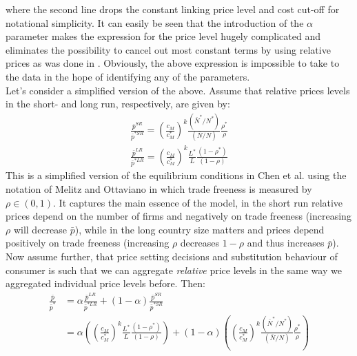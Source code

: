 where the second line drops the constant linking price level and cost cut-off for notational simplicity. It can easily be seen that the introduction of the $\alpha$ parameter makes the expression for the price level hugely complicated and eliminates the possibility to cancel out most constant terms by using relative prices as was done in \citet{Chen2009}. Obviously, the above expression is impossible to take to the data in the hope of identifying any of the parameters. \\
Let's consider a simplified version of the above. Assume that relative prices levels in the short- and long run, respectively, are given by:
\begin{align*}
\frac{\bar{p}^{SR}}{\bar{p}^{*SR}} = \left( \frac{c_M}{c_M^*} \right)^k \frac{(\bar{N}^* / N^*)}{(\bar{N} / N)} \frac{\rho^*}{\rho} \\
\frac{\bar{p}^{LR}}{\bar{p}^{*LR}} = \left( \frac{c_M}{c_M^*} \right)^k \frac{L^*}{L} \frac{(1-\rho^*)}{(1-\rho)}
\end{align*}
This is a simplified version of the equilibrium conditions in Chen et al. using the notation of Melitz and Ottaviano in which trade freeness is measured by $\rho \in (0,1)$. It captures the main essence of the model, in the short run relative prices depend on the number of firms and negatively on trade freeness (increasing $\rho$ will decrease $\bar{p}$), while in the long country size matters and prices depend positively on trade freeness (increasing $\rho$ decreases $1-\rho$ and thus increases $\bar{p}$). Now assume further, that price setting decisions and substitution behaviour of consumer is such that we can aggregate \textit{relative} price levels in the same way we aggregated individual price levels before. Then:
\begin{align*}
\frac{\bar{p}}{\bar{p}^*} &= \alpha \frac{\bar{p}^{LR}}{\bar{p}^{*LR}} + (1-\alpha) \frac{\bar{p}^{SR}}{\bar{p}^{*SR}} \\
													&= \alpha \left( \left( \frac{c_M}{c_M^*} \right)^k \frac{L^*}{L} \frac{(1-\rho^*)}{(1-\rho)} \right) + (1-\alpha) \left( \left( \frac{c_M}{c_M^*} \right)^k \frac{(\bar{N}^* / N^*)}{(\bar{N} / N)} \frac{\rho^*}{\rho} \right)
\end{align*}
